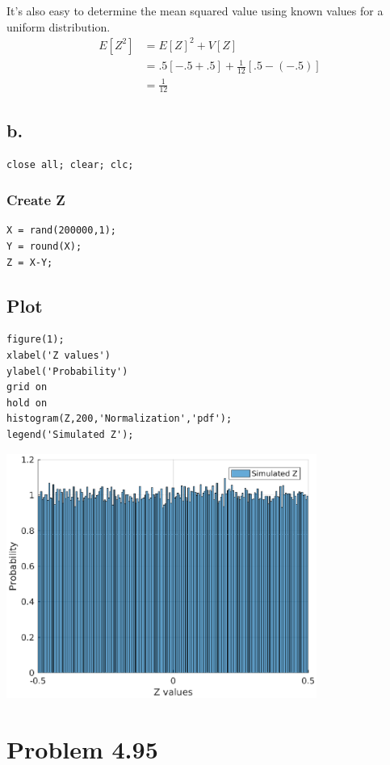 \documentclass[12pt]{article}
\begin{document}
It's also easy to determine the mean squared value using known values for a uniform distribution. 
\begin{align*}
  E[Z^2] &= E[Z]^2 + V[Z] \\
  &= .5[-.5 + .5] + \frac{1}{12}[.5-(-.5)] \\
  &= \frac{1}{12}
\end{align*}

\subsection*{b.}

\begin{verbatim}
close all; clear; clc;
\end{verbatim}


\subsubsection*{Create Z}

\begin{verbatim}
X = rand(200000,1);
Y = round(X);
Z = X-Y;
\end{verbatim}


\subsection*{Plot}

\begin{verbatim}
figure(1);
xlabel('Z values')
ylabel('Probability')
grid on
hold on
histogram(Z,200,'Normalization','pdf');
legend('Simulated Z');
\end{verbatim}

\includegraphics [width=4in]{problem_4_93_01.eps}
\section*{Problem 4.95}
\end{document}
